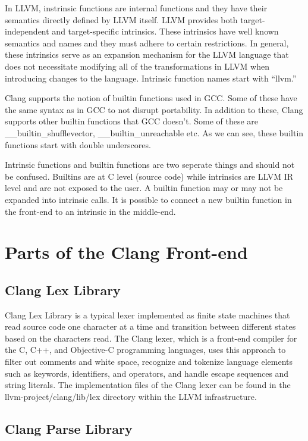 In LLVM, instrinsic functions are internal functions and they have their semantics directly defined by LLVM itself. LLVM provides both target-independent and target-specific intrinsics. \cite{llvmdevmeeting} These intrinsics have well known semantics and names and they must adhere to certain restrictions. In general, these intrinsics serve as an expansion mechanism for the LLVM language that does not necessitate modifying all of the transformations in LLVM when introducing changes to the language. Intrinsic function names start with “llvm.” \cite{googlesiteintrinsic}

Clang supports the notion of builtin functions used in GCC. Some of these have the same syntax as in GCC to not disrupt portability. In addition to these, Clang supports other builtin functions that GCC doesn’t. Some of these are \_\_builtin\_shufflevector, \_\_builtin\_unreachable etc. As we can see, these builtin functions start with double underscores. 

Intrinsic functions and builtin functions are two seperate things and should not be confused. Builtins are at C level (source code) while intrinsics are LLVM IR level and are not exposed to the user. A builtin function may or may not be expanded into intrinsic calls. It is possible to connect a new builtin function in the front-end to an intrinsic in the middle-end.

\section{Parts of the Clang Front-end}

\subsection{Clang Lex Library}
Clang Lex Library is a typical lexer implemented as finite state machines that read source code one character at a time and transition between different states based on the characters read. The Clang lexer, which is a front-end compiler for the C, C++, and Objective-C programming languages, uses this approach to filter out comments and white space, recognize and tokenize language elements such as keywords, identifiers, and operators, and handle escape sequences and string literals. The implementation files of the Clang lexer can be found in the llvm-project/clang/lib/lex directory within the LLVM infrastructure.
	

\subsection{Clang Parse Library}


